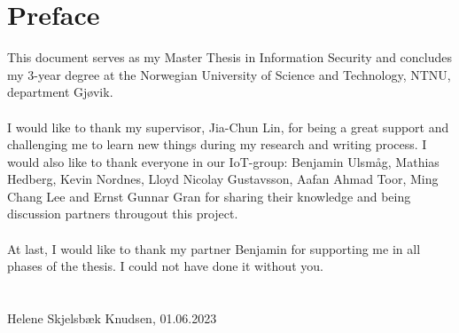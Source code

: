 \chapter*{Preface}
This document serves as my Master Thesis in Information Security and concludes my 3-year degree at the Norwegian University of Science and Technology, NTNU, department Gjøvik.
\\\\
I would like to thank my supervisor, Jia-Chun Lin, for being a great support and challenging me to learn new things during my research and writing process. I would also like to thank everyone in our IoT-group: Benjamin Ulsmåg, Mathias Hedberg, Kevin Nordnes, Lloyd Nicolay Gustavsson, Aafan Ahmad Toor, Ming Chang Lee and Ernst Gunnar Gran for sharing their knowledge and being discussion partners througout this project. 
\\\\
At last, I would like to thank my partner Benjamin for supporting me in all phases of the thesis. I could not have done it without you. 
\\\\\\
Helene Skjelsbæk Knudsen, 01.06.2023
